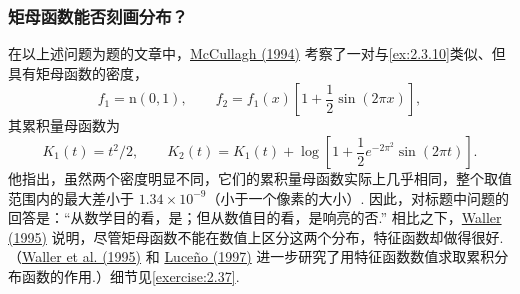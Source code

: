 \subsubsection{矩母函数能否刻画分布？}\label{sec:2.6.3}
在以上述问题为题的文章中，\hyperref[bib:source215]{McCullagh (1994)} 考察了一对与\autoref{ex:2.3.10}类似、但具有矩母函数的密度，
$$f_1=\mathrm n(0,1),\qquad f_2=f_1(x)\left[1+\frac12\sin(2\pi x)\right],$$
其累积量母函数为
$$K_1(t)=t^2/2,\qquad K_2(t)=K_1(t)+\log\left[1+\frac12e^{-2\pi^2}\sin(2\pi t)\right].$$
他指出，虽然两个密度明显不同，它们的累积量母函数实际上几乎相同，整个取值范围内的最大差小于 $1.34\times10^{-9}$（小于一个像素的大小）. 因此，对标题中问题的回答是：“从数学目的看，是；但从数值目的看，是响亮的否.” 相比之下，\hyperref[bib:source325]{Waller (1995)} 说明，尽管矩母函数不能在数值上区分这两个分布，特征函数却做得很好. （\hyperref[bib:source326]{Waller et al. (1995)} 和 \hyperref[bib:source211]{Luce\~no (1997)} 进一步研究了用特征函数数值求取累积分布函数的作用.）细节见\autoref{exercise:2.37}.
